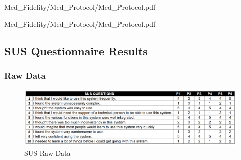 \documentclass[a4 paper, 12pt]{article}
\begin{document}
    \pagebreak     
    
                    {Med_Fidelity/Med_Protocol/Med_Protocol.pdf}
                    \label{sec:B.4}
    
                    {Med_Fidelity/Med_Protocol/Med_Protocol.pdf}

    \pagebreak     
    
                \label{sec:B.5}
    

    \pagebreak     
    
                \label{sec:B.6}


    \pagebreak    
    \subsection{SUS Questionnaire Results}
    \label{sec:B.7} 

    \subsubsection*{Raw Data}
        \begin{figure} [H]
            \centering
            \includegraphics[width=\textwidth, frame]
                {./Med_Fidelity/Med_SUS_Raw.PNG}  
            \caption{SUS Raw Data}
        \end{figure}
\end{document}
